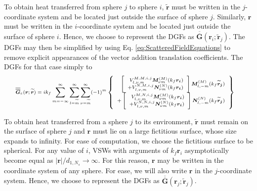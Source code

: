To obtain heat transferred from sphere $j$ to sphere $i$, $\widetilde{\boldsymbol{r}}$ must be written in the $j$-coordinate system and be located just outside the surface of sphere $j$. Similarly, $\boldsymbol{r}$ must be written in the $i$-coordinate system and be located just outside the surface of sphere $i$. Hence, we choose to represent the DGFs as $\overline{\overline{\boldsymbol{G}}}(\boldsymbol{r}_{i}; \widetilde{\boldsymbol{r}}_{j})$. The DGFs may then be simplified by using Eq. \ref{eq:ScatteredFieldEquations} to remove explicit appearances of the vector addition translation coefficients. The DGFs for that case simply to
%
\begin{equation}\label{eq:ElectricDGF_spheresphere} \scriptsize
\begin{split}
\overline{\overline{\boldsymbol{G}}}_{e}(\boldsymbol{r}; \boldsymbol{\widetilde{r}})
& = ik_{f} \sum_{m=-\infty}^{\infty} \sum_{l=\widetilde{m}}^{\infty} \sum_{\nu = \widetilde{m}}^{\infty} (-1)^{m}
\left\{ \begin{array}{r} \left[ \begin{array}{r}
V_{l, \nu,m}^{M,M,i,j} \boldsymbol{M}_{\nu m}^{(M)}(k_{f} \boldsymbol{r_{i}})
\\
+ V_{l, \nu,m}^{N,M,i,j} \boldsymbol{N}_{\nu m}^{(N)}(k_{f} \boldsymbol{r_{i}})
\end{array} \right] \boldsymbol{M}_{l, -m}^{(M)}(k_{f} \boldsymbol{\widetilde{r}_{j}})
\\
+ \left[ \begin{array}{r}
V_{l, \nu,m}^{M,N,i,j} \boldsymbol{M}_{\nu m}^{(M)}(k_{f} \boldsymbol{r_{i}})
\\
+ V_{l, \nu,m}^{N,N,i,j} \boldsymbol{N}_{\nu m}^{(N)}(k_{f} \boldsymbol{r_{i}})
\end{array} \right] \boldsymbol{N}_{l, -m}^{(N)}(k_{f} \boldsymbol{\widetilde{r}_{j}})
\end{array} \right\}
\end{split}
\end{equation}

To obtain heat transferred from a sphere $j$ to its environment, $\widetilde{\boldsymbol{r}}$ must remain on the surface of sphere $j$ and $\boldsymbol{r}$ must lie on a large fictitious surface, whose size expands to infinity. For ease of computation, we choose the fictitious surface to be spherical. For any value of $i$, VSWs with arguments of $k_{f} \boldsymbol{r}_{i}$ asymptotically become equal as $| \boldsymbol{r} |/d_{1,N_{s}} \rightarrow \infty$. For this reason, $\boldsymbol{r}$ may be written in the coordinate system of any sphere. For ease, we will also write $\boldsymbol{r}$ in the $j$-coordinate system. Hence, we choose to represent the DGFs as $\overline{\overline{\boldsymbol{G}}}(\boldsymbol{r}_{j}; \widetilde{\boldsymbol{r}}_{j})$.

